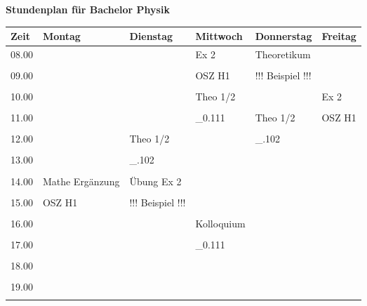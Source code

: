 \begin{sideways}
\begin{minipage}{1\textheight}
\center \textbf{\Large Stundenplan für Bachelor Physik}\bigskip\\
\begin{tabular}{|p{.05\textheight}||p{.16\textheight}|p{.16\textheight}|p{.16\textheight}|p{.16\textheight}|p{.16\textheight}|}\hline
 Zeit 		& Montag 			& Dienstag 			& Mittwoch 		& Donnerstag 		& Freitag	\\ \hline\hline
{08.00} 	& 					&					&  {Ex 2}		& {Theoretikum} 	&  			\\ 
&&&&&\\ \cline{1-3} \cline{6-6}
{09.00} 	& 					&					&  {OSZ H1}		& {!!! Beispiel !!!}&			\\
&&&&&\\ \cline{1-6}
{10.00} 	& 	 				&  					& {Theo 1/2}	& 					& {Ex 2}	\\
&&&&&\\ \cline{1-3}\cline{5-5}
{11.00} 	& 	 				& 					& {\_0.111} 	&  {Theo 1/2}		& {OSZ H1}	\\
&&&&&\\ \cline{1-4} \cline{6-6}
{12.00} 	& 					& {Theo 1/2}		& 	 			& {\_.102}			& 			\\
&&&&&\\ \cline{1-2} \cline{4-6}
{13.00} 	&					& 	{\_.102}		& 				& 					&  			\\
&&&&&\\ \hline 
{14.00} 	& {Mathe Ergänzung} &{Übung Ex 2}		& 				&  					& 			\\
&&&&&\\ \cline{1-1}  \cline{4-6}
{15.00} 	& {OSZ H1}	 		&{!!! Beispiel !!!}	& 				&	  				& 			\\
&&&&&\\ \hline
 {16.00} 	&  					&  					& {Kolloquium} 	&  					& 			\\
&&&&&\\ \cline{1-3} \cline{5-6}
 {17.00} 	&  					&  					& {\_0.111} 	&  					& 			\\
&&&&&\\ \hline 
 {18.00} 	&  					&	  				& 		 		&		  			& 			\\
&&&&&\\ \hline
 {19.00} 	&  					&  					&  				& 					& 			\\
&&&&&\\ \hline
\end{tabular}
\end{minipage}
\end{sideways}
